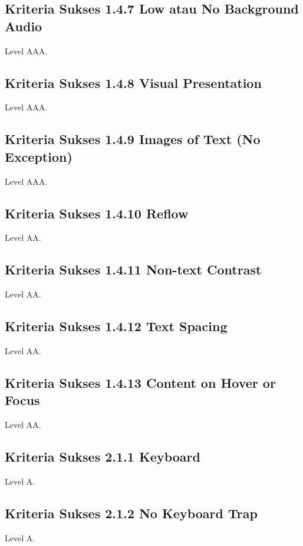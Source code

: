\subsection{Kriteria Sukses 1.4.7 Low atau No Background Audio}
\label{sec:kriteria_1.4.7}

Level AAA.

\subsection{Kriteria Sukses 1.4.8 Visual Presentation}
\label{sec:kriteria_1.4.8}
Level AAA.

\subsection{Kriteria Sukses 1.4.9 Images of Text (No Exception)}
\label{sec:kriteria_1.4.9}
Level AAA.

\subsection{Kriteria Sukses 1.4.10 Reflow}
\label{sec:kriteria_1.4.10}
Level AA.

\subsection{Kriteria Sukses 1.4.11 Non-text Contrast}
\label{sec:kriteria_1.4.11}
Level AA.

\subsection{Kriteria Sukses 1.4.12 Text Spacing}
\label{sec:kriteria_1.4.12}
Level AA.

\subsection{Kriteria Sukses 1.4.13 Content on Hover or Focus}
\label{sec:kriteria_1.4.13}
Level AA.

\subsection{Kriteria Sukses 2.1.1 Keyboard}
\label{sec:kriteria_2.1.1}
Level A.

\subsection{Kriteria Sukses 2.1.2 No Keyboard Trap}
\label{sec:kriteria_2.1.2}
Level A.

